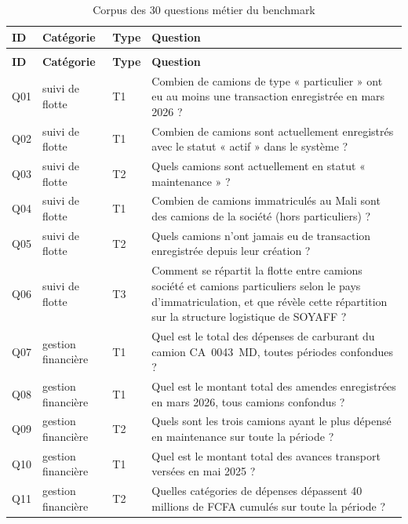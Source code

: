 \begin{longtable}{|>{\raggedright\arraybackslash}p{0.9cm}|>{\raggedright\arraybackslash}p{2.7cm}|>{\raggedright\arraybackslash}p{0.9cm}|>{\raggedright\arraybackslash}p{9.2cm}|}
\caption{Corpus des 30 questions métier du benchmark}
\label{tab:annexe_corpus} \\
\hline
\rowcolor[HTML]{EFEFEF}
\textbf{ID} & \textbf{Catégorie} & \textbf{Type} & \textbf{Question} \\ \hline
\endfirsthead
\multicolumn{4}{c}{\tablename\ \thetable\ (suite)} \\ \hline
\rowcolor[HTML]{EFEFEF}
\textbf{ID} & \textbf{Catégorie} & \textbf{Type} & \textbf{Question} \\ \hline
\endhead
Q01 & suivi de flotte & T1 & Combien de camions de type « particulier » ont eu au moins une transaction enregistrée en mars 2026 ? \\ \hline
Q02 & suivi de flotte & T1 & Combien de camions sont actuellement enregistrés avec le statut « actif » dans le système ? \\ \hline
Q03 & suivi de flotte & T2 & Quels camions sont actuellement en statut « maintenance » ? \\ \hline
Q04 & suivi de flotte & T1 & Combien de camions immatriculés au Mali sont des camions de la société (hors particuliers) ? \\ \hline
Q05 & suivi de flotte & T2 & Quels camions n'ont jamais eu de transaction enregistrée depuis leur création ? \\ \hline
Q06 & suivi de flotte & T3 & Comment se répartit la flotte entre camions société et camions particuliers selon le pays d'immatriculation, et que révèle cette répartition sur la structure logistique de SOYAFF ? \\ \hline
Q07 & gestion financière & T1 & Quel est le total des dépenses de carburant du camion CA~0043~MD, toutes périodes confondues ? \\ \hline
Q08 & gestion financière & T1 & Quel est le montant total des amendes enregistrées en mars 2026, tous camions confondus ? \\ \hline
Q09 & gestion financière & T2 & Quels sont les trois camions ayant le plus dépensé en maintenance sur toute la période ? \\ \hline
Q10 & gestion financière & T1 & Quel est le montant total des avances transport versées en mai 2025 ? \\ \hline
Q11 & gestion financière & T2 & Quelles catégories de dépenses dépassent 40 millions de FCFA cumulés sur toute la période ? \\ \hline

\end{longtable}
